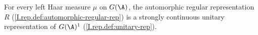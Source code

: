 For every left Haar measure $\mu$ on $G(\A)$, the automorphic regular representation $R$
(\cref{I.rep.def:automorphic-regular-rep}) is a strongly continuous unitary representation of $G(\A)^1$
(\cref{I.rep.def:unitary-rep}).
